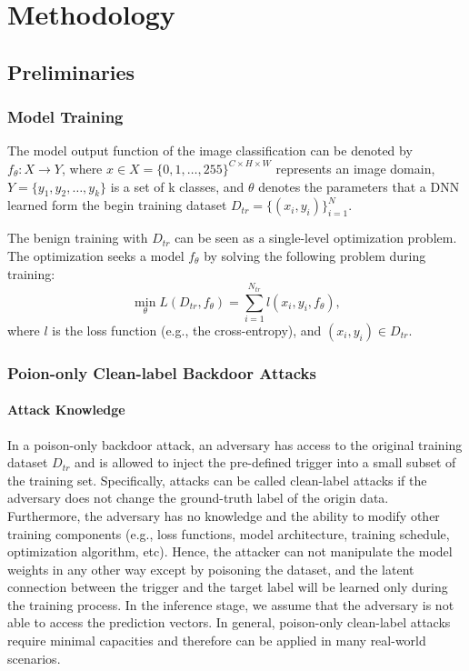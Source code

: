 \documentclass{article}
\begin{document}
\section{Methodology}
\subsection{Preliminaries}
\subsubsection{Model Training}
The model output function of the image classification can be denoted by \(f_\theta:X \to Y\), where \(x \in X=\{0,1,\ldots,255\}^{C \times H \times W }\) represents an image domain, \(Y=\{y_1,y_2,\ldots,y_k\}\) is a set of k classes, and \(\theta\) denotes the parameters that a DNN learned form the begin training dataset \(D_{tr} = \{(x_i, y_i)\}_{i=1}^{N}\). 

The benign training with \(D_{tr}\) can be seen as a single-level optimization problem. The optimization seeks a model \(f_\theta\) by solving the following problem during training:
\begin{equation}
\min_{\theta} L(D_{tr}, f_{\theta}) = \sum_{i=1}^{N_{tr}}l(x_i,y_i,f_{\theta}),
\end{equation}
where \(l\) is the loss function (e.g., the cross-entropy), and \((x_i,y_i) \in D_{tr}\).
\subsubsection{Poion-only Clean-label Backdoor Attacks}
\paragraph{Attack Knowledge}
In a poison-only backdoor attack, an adversary has access to the original training dataset \(D_{tr}\) and is allowed to inject the pre-defined trigger into a small subset of the training set. Specifically, attacks can be called clean-label attacks if the adversary does not change the ground-truth label of the origin data. Furthermore, the adversary has no knowledge and the ability to modify other training components (e.g., loss functions, model architecture, training schedule, optimization algorithm, etc). Hence, the attacker can not manipulate the model weights in any other way except by poisoning the dataset, and the latent connection between the trigger and the target label will be learned only during the training process. In the inference stage, we assume that the adversary is not able to access the prediction vectors. In general, poison-only clean-label attacks require minimal capacities and therefore can be applied in many real-world scenarios. 
\end{document}
